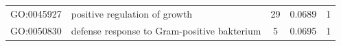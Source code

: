 \documentclass[10pt,letterpaper]{article}
\begin{document}
{\begin{table}[]
\begin{adjustwidth}{-2.25in}{}
\begin{tabular}{llccc}
GO:0045927          & positive regulation of growth                                                              & 29                                                     & 0.0689                                                & 1                                                  \\
GO:0050830          & defense response to Gram-positive bakterium%
& 5                                                      & 0.0695                                                & 1    \\\hline
\end{tabular}
\end{adjustwidth}
\end{table}


}
\end{document}
